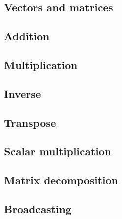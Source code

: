 
\subsection{Vectors and matrices}

\subsection{Addition}

\subsection{Multiplication}

\subsection{Inverse}

\subsection{Transpose}

\subsection{Scalar multiplication}

\subsection{Matrix decomposition}

\subsection{Broadcasting}

